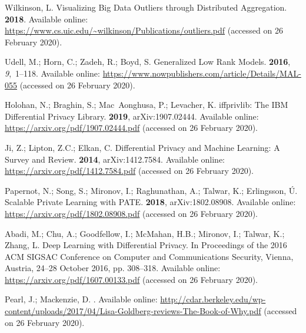 \documentclass[information,article,accept,moreauthors,pdftex]{Definitions/mdpi}
\begin{document}
{\begin{thebibliography}{999}
Wilkinson, L.
\newblock Visualizing Big Data Outliers through Distributed Aggregation.
 {\bf
  2018}.
\newblock Available online: 
  \url{https://www.cs.uic.edu/~wilkinson/Publications/outliers.pdf} (accessed on 26 February 2020).

Udell, M.; Horn, C.; Zadeh, R.; Boyd, S.
\newblock Generalized {L}ow {R}ank {M}odels.
  {\bf 2016}, {\em 9},~1--118.
\newblock Available online: \url{https://www.nowpublishers.com/article/Details/MAL-055} (accessed on 26 February 2020).

Holohan, N.; Braghin, S.; Mac~Aonghusa, P.; Levacher, K.
iffprivlib: {T}he {I}{B}{M} {D}ifferential {P}rivacy {L}ibrary.
 {\bf 2019}, arXiv:1907.02444.
\newblock Available online: \url{https://arxiv.org/pdf/1907.02444.pdf} (accessed on 26 February 2020).

Ji, Z.; Lipton, Z.C.; Elkan, C.
\newblock Differential {P}rivacy and {M}achine {L}earning: {A} {S}urvey and
  {R}eview.
 {\bf 2014}, arXiv:1412.7584.
\newblock Available online: \url{https://arxiv.org/pdf/1412.7584.pdf} (accessed on 26 February 2020).

Papernot, N.; Song, S.; Mironov, I.; Raghunathan, A.; Talwar, K.; Erlingsson,
  {\'U}.
\newblock Scalable {P}rivate {L}earning with {P}{A}{T}{E}.
 {\bf 2018}, arXiv:1802.08908.
\newblock Available online: \url{https://arxiv.org/pdf/1802.08908.pdf} (accessed on 26 February 2020).

Abadi, M.; Chu, A.; Goodfellow, I.; McMahan, H.B.; Mironov, I.; Talwar, K.;
  Zhang, L.
\newblock Deep {L}earning with {D}ifferential {P}rivacy.
\newblock  In Proceedings of the 2016 ACM SIGSAC Conference on Computer and
  Communications Security, Vienna, Austria, 24--28 October 2016, pp. 308--318. 
\newblock Available online: \url{https://arxiv.org/pdf/1607.00133.pdf} (accessed on 26 February 2020).

Pearl, J.; Mackenzie, D.
.
\newblock Available online: 
  \url{http://cdar.berkeley.edu/wp-content/uploads/2017/04/Lisa-Goldberg-reviews-The-Book-of-Why.pdf} (accessed on 26 February 2020).


\end{thebibliography}}
\end{document}
